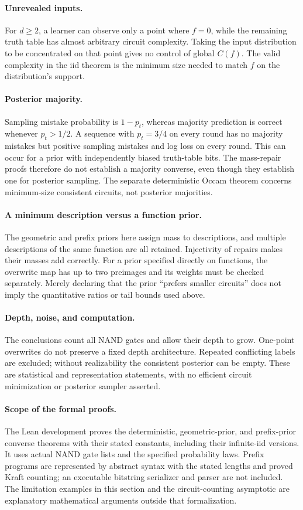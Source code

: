 \documentclass[11pt]{article}
\newcommand{\1}{\mathbf 1}
\begin{document}
\paragraph{Unrevealed inputs.}
For $d\ge2$, a learner can observe only a point where $f=0$, while the
remaining truth table has almost arbitrary circuit complexity. Taking
the input distribution to be concentrated on that point gives no control
of global $C(f)$. The valid complexity in the iid theorem is the minimum
size needed to match $f$ on the distribution's support.

\paragraph{Posterior majority.}
Sampling mistake probability is $1-p_t$, whereas majority prediction is
correct whenever $p_t>1/2$. A sequence with $p_t=3/4$ on every round has
no majority mistakes but positive sampling mistakes and log loss on every
round. This can occur for a prior with independently biased truth-table
bits. The mass-repair proofs therefore do not establish a majority
converse, even though they establish one for posterior sampling. The
separate deterministic Occam theorem concerns minimum-size consistent
circuits, not posterior majorities.

\paragraph{A minimum description versus a function prior.}
The geometric and prefix priors here assign mass to descriptions, and
multiple descriptions of the same function are all retained. Injectivity
of repairs makes their masses add correctly. For a prior specified
directly on functions, the overwrite map has up to two preimages and
its weights must be checked separately. Merely declaring that the prior
``prefers smaller circuits'' does not imply the quantitative ratios or
tail bounds used above.

\paragraph{Depth, noise, and computation.}
The conclusions count all NAND gates and allow their depth to grow.
One-point overwrites do not preserve a fixed depth architecture. Repeated
conflicting labels are excluded; without realizability the consistent
posterior can be empty. These are statistical and representation
statements, with no efficient circuit minimization or posterior sampler
asserted.

\paragraph{Scope of the formal proofs.}
The Lean development proves the deterministic, geometric-prior, and
prefix-prior converse theorems with their stated constants, including
their infinite-iid versions. It uses actual NAND gate lists and the
specified probability laws. Prefix programs are represented by abstract
syntax with the stated lengths and proved Kraft counting; an executable
bitstring serializer and parser are not included. The limitation examples
in this section and the circuit-counting asymptotic are explanatory
mathematical arguments outside that formalization.
\end{document}
